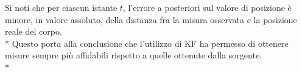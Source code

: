 Si noti che per ciascun istante $t$, l'errore a posteriori sul valore di posizione \`e minore, in valore assoluto, della distanza fra la misura osservata e la posizione reale del corpo.\\*
Questo porta alla conclusione che l'utilizzo di KF ha permesso di ottenere misure sempre pi\`u affidabili rispetto a quelle ottenute dalla sorgente.\\*